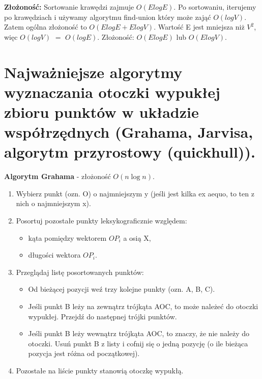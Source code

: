 \documentclass[main.tex]{subfiles}
\begin{document}
    \textbf{Złożoność:} Sortowanie krawędzi zajmuje $O(ElogE)$. Po sortowaniu, iterujemy po krawędziach i używamy algorytmu find-union który może zająć $O(logV)$. Zatem ogólna złożoność to $O(ElogE+ElogV)$. Wartość E jest mniejsza niż $V^2$, więc $O(logV)$ $=$ $O(logE)$. Złożoność: $O(ElogE)$ lub $O(ElogV)$.

    \newpage

    \section{Najważniejsze algorytmy wyznaczania otoczki wypukłej zbioru punktów w układzie współrzędnych (Grahama, Jarvisa, algorytm przyrostowy (quickhull)).}

    \begin{definition}
        \textbf{Algorytm Grahama} - złożoność $O(n \log n)$.
        \begin{enumerate}
            \item Wybierz punkt (ozn. O) o najmniejszym y (jeśli jest kilka ex aequo, to ten z nich o najmniejszym x).
            \item Posortuj pozostałe punkty leksykograficznie względem:
            \begin{itemize}
                \item kąta pomiędzy wektorem $OP_i$ a osią X,
                \item długości wektora $OP_i$.
            \end{itemize}
            \item Przeglądaj listę posortowanych punktów:
            \begin{itemize}
                \item Od bieżącej pozycji weź trzy kolejne punkty (ozn. A, B, C).
                \item Jeśli punkt B leży na zewnątrz trójkąta AOC, to może należeć do otoczki wypukłej. Przejdź do następnej trójki punktów.
                \item Jeśli punkt B leży wewnątrz trójkąta AOC, to znaczy, że nie należy do otoczki. Usuń punkt B z listy i cofnij się o jedną pozycję (o ile bieżąca pozycja jest różna od początkowej).
            \end{itemize}
            \item Pozostałe na liście punkty stanowią otoczkę wypukłą.
        \end{enumerate}
    \end{definition}
\end{document}
